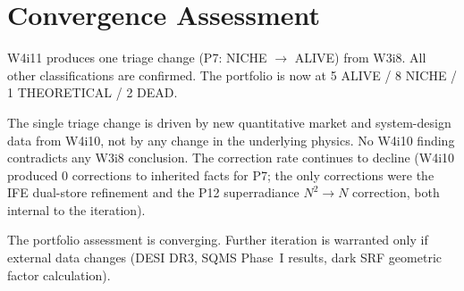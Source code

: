 \documentclass[11pt]{article}
\begin{document}
\section{Convergence Assessment}

W4i11 produces one triage change (P7: NICHE $\to$ ALIVE) from W3i8.
All other classifications are confirmed. The portfolio is now at
5 ALIVE / 8 NICHE / 1 THEORETICAL / 2 DEAD.

The single triage change is driven by new quantitative market and
system-design data from W4i10, not by any change in the underlying
physics. No W4i10 finding contradicts any W3i8 conclusion. The
correction rate continues to decline (W4i10 produced 0 corrections
to inherited facts for P7; the only corrections were the IFE
dual-store refinement and the P12 superradiance $N^2 \to N$
correction, both internal to the iteration).

The portfolio assessment is converging. Further iteration is warranted
only if external data changes (DESI DR3, SQMS Phase~I results, dark
SRF geometric factor calculation).
\end{document}
